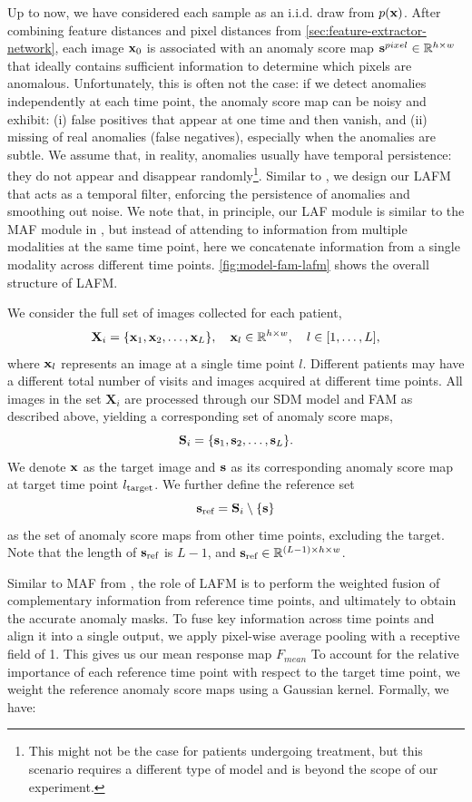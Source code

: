 Up to now, we have considered each sample as an i.i.d. draw from $p({\mathbf{x}})$. After combining feature distances and pixel distances from \cref{sec:feature-extractor-network}, each image ${\mathbf{x}}_0$ is associated with an anomaly score map ${\mathbf{s}}^{pixel} \in \mathbb{R}^{h \times w}$ that ideally contains sufficient information to determine which pixels are anomalous. Unfortunately, this is often not the case: if we detect anomalies independently at each time point, the anomaly score map can be noisy and exhibit: (i) false positives that appear at one time and then vanish, and (ii) missing of real anomalies (false negatives), especially when the anomalies are subtle. We assume that, in reality, anomalies usually have temporal persistence: they do not appear and disappear randomly\footnote{This might not be the case for patients undergoing treatment, but this scenario requires a different type of model and is beyond the scope of our experiment.}. Similar to \cite{wangEPDiffErasurePerception2025}, we design our \ac{LAFM} that acts as a temporal filter, enforcing the persistence of anomalies and smoothing out noise. We note that, in principle, our \ac{LAF} module is similar to the MAF module in \cite{wangEPDiffErasurePerception2025}, but instead of attending to information from multiple modalities at the same time point, here we concatenate information from a single modality across different time points. \cref{fig:model-fam-lafm} shows the overall structure of LAFM. 

We consider the full set of images collected for each patient, 
\[
\mathbf{X}_i = \{{\mathbf{x}}_1, {\mathbf{x}}_2, \dots, {\mathbf{x}}_L\}, \quad {\mathbf{x}}_l \in \mathbb{R}^{h \times w}, \quad l \in [1, \dots, L],
\] 
where ${\mathbf{x}}_l$ represents an image at a single time point $l$. Different patients may have a different total number of visits and images acquired at different time points. All images in the set $\mathbf{X}_i$ are processed through our \ac{SDM} model and \ac{FAM} as described above, yielding a corresponding set of anomaly score maps, 
\[
\mathbf{S}_i = \{{\mathbf{s}}_1, {\mathbf{s}}_2, \dots, {\mathbf{s}}_L\}.
\] 
We denote ${\mathbf{x}}$ as the target image and ${\mathbf{s}}$ as its corresponding anomaly score map at target time point $l_{\textnormal{target}}$. We further define the reference set 
\[
{\mathbf{s}}_{\text{ref}} = \mathbf{S}_i \setminus \{{\mathbf{s}}\}
\] 
as the set of anomaly score maps from other time points, excluding the target. Note that the length of ${\mathbf{s}}_{\text{ref}}$ is $L - 1$, and ${\mathbf{s}}_{\text{ref}} \in \mathbb{R}^{(L-1) \times h \times w}$.

Similar to MAF from \cite{wangEPDiffErasurePerception2025}, the role of \ac{LAFM} is to perform the weighted fusion of complementary information from reference time points, and ultimately to obtain the accurate anomaly masks. To fuse key information across time points and align it into a single output, we apply pixel-wise average pooling with a receptive field of 1. This gives us our mean response map $F_{mean}$ To account for the relative importance of each reference time point with respect to the target time point, we weight the reference anomaly score maps using a Gaussian kernel. Formally, we have: 

